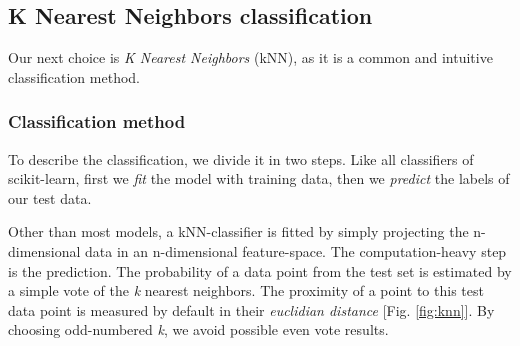 \subsection{K Nearest Neighbors classification}\label{sec:kNN}
Our next choice is \emph{K Nearest Neighbors} (kNN), as it is a common and intuitive classification method. 

\subsubsection{Classification method}
To describe the classification, we divide it in two steps. Like all classifiers of scikit-learn, first we \emph{fit} the model with training data, then we \emph{predict} the labels of our test data.

Other than most models, a kNN-classifier is fitted by simply projecting the n-dimensional data in an n-dimensional feature-space. The computation-heavy step is the prediction. The probability of a data point from the test set is estimated by a simple vote of the \emph{k} nearest neighbors. The proximity of a point to this test data point is measured by default in their \emph{euclidian distance} [Fig. \ref{fig:knn}]. By choosing odd-numbered \emph{k}, we avoid possible even vote results.

